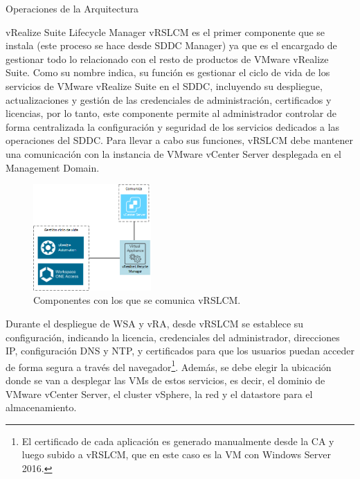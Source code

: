 \begin{subsection}{Operaciones de la Arquitectura}
    \begin{subsubsection}{vRealize Suite Lifecycle Manager}
        vRSLCM es el primer componente que se instala (este proceso se hace desde SDDC Manager) ya que es el encargado de gestionar todo lo relacionado con el resto de productos de VMware vRealize Suite.  Como su nombre indica, su función es gestionar el ciclo de vida de los servicios de VMware vRealize Suite en el SDDC, incluyendo su despliegue, actualizaciones y gestión de las credenciales de administración, certificados y licencias, por lo tanto, este componente permite al administrador controlar de forma centralizada la configuración y seguridad de los servicios dedicados a las operaciones del SDDC. Para llevar a cabo sus funciones, vRSLCM debe mantener una comunicación con la instancia de VMware vCenter Server desplegada en el Management Domain.
        \begin{figure}[h]
            \centering
            \includegraphics[width=0.4\textwidth]{imaxes/pruebaconcepto/vrealize/diseno-vrlscm.png}
            \caption{Componentes con los que se comunica vRSLCM.}
            \label{fig:vrealize-components}
        \end{figure}
        \FloatBarrier        
        Durante el despliegue de WSA y vRA, desde vRSLCM se establece su configuración, indicando la licencia, credenciales del administrador, direcciones IP, configuración DNS y NTP, y certificados para que los usuarios puedan acceder de forma segura a través del navegador\footnote{El certificado de cada aplicación es generado manualmente desde la CA y luego subido a vRSLCM, que en este caso es la VM con Windows Server 2016.}. Además, se debe elegir la ubicación donde se van a desplegar las VMs de estos servicios, es decir, el dominio de VMware vCenter Server, el cluster vSphere, la red y el datastore para el almacenamiento.

\end{subsubsection}
\end{subsection}
